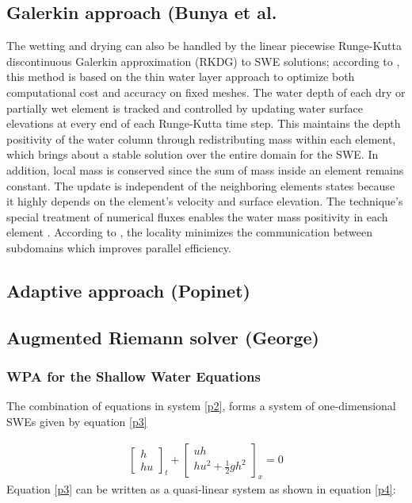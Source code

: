 \documentclass[11pt,a4paper]{article}
\newcommand{\donna}[1]{{\color{red}{#1}}}
\begin{document}
	\subsection{Galerkin approach (Bunya et al.}  
		The wetting and drying can also be handled by the linear piecewise  Runge-Kutta discontinuous Galerkin approximation (RKDG)  to SWE solutions;  according to \citet{bu-ku-we-da:2009}, this method is based on the thin water layer approach to optimize both computational cost and accuracy on fixed meshes. The water depth of each dry or partially wet element is tracked and controlled by updating water surface elevations at every end of each Runge-Kutta time step. This maintains the depth positivity of the water column through redistributing mass within each element, which brings about a stable solution over the entire domain for the SWE. In addition, local mass is conserved since the sum of mass inside an element remains constant. The update is independent of the neighboring elements states because it highly depends on the element's velocity and surface elevation. The technique's special treatment of numerical fluxes enables the water mass positivity in each element \cite{bu-ku-we-da:2009,kubatko2007semi}. According to \citet{bokhove2005flooding,bu-ku-we-da:2009}, the locality minimizes the communication between subdomains which improves parallel efficiency. 

	\subsection{Adaptive approach (Popinet)}
	\donna{Maybe a short section on quadtree adaptivity and the wet/dry approach + }

	\subsection{Augmented Riemann solver (George)}

	\subsubsection{WPA for the Shallow Water Equations}
	The combination of equations in system \eqref{p2}, forms a system of one-dimensional SWEs given by equation \eqref{p3}
	
	\begin{eqnarray}
		\begin{bmatrix} h \\ hu \end{bmatrix}_t + \begin{bmatrix} uh \\ hu^{2} + \frac{1}{2} gh^{2} \end{bmatrix}_x  = 0 
		\label{p3}
	\end{eqnarray}
	Equation \eqref{p3} can be written as a quasi-linear system as shown in equation \eqref{p4}:
	
\end{document}
